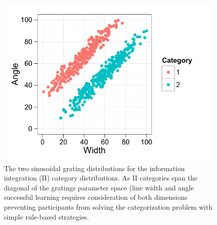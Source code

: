 \begin{figure}[tp]
    \includegraphics{f_II}
    \centering
    \caption{The two sinusoidal grating distributions for the information integration (II) category distributions.   As II categories span the diagonal of the gratings parameter space (line width and angle successful learning requires consideration of both dimensions preventing participants from solving the categorization problem with simple rule-based strategies.}
    \label{fig:II}
\end{figure}

